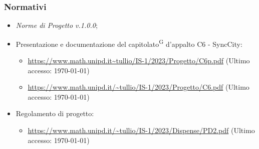 \documentclass[8pt]{article}
\newcommand{\glossterm}[1]{#1\textsuperscript{G}} %
\begin{document}
\subsubsection{Normativi}
\begin{itemize}
	\item \textit{Norme di Progetto v.1.0.0};
	\item Presentazione e documentazione del \glossterm{capitolato} d’appalto C6 - SyncCity:
	\begin{itemize}
		\item \href{https://www.math.unipd.it/~tullio/IS-1/2023/Progetto/C6p.pdf}{\color{myblue}https://www.math.unipd.it\textasciitilde{}tullio/IS-1/2023/Progetto/C6p.pdf} (Ultimo accesso: \today)
		\item \href{https://www.math.unipd.it/~tullio/IS-1/2023/Progetto/C6.pdf}{\color{myblue}https://www.math.unipd.it/\textasciitilde{}tullio/IS-1/2023/Progetto/C6.pdf} (Ultimo accesso: \today)
	\end{itemize}
	\item Regolamento di progetto:
	\begin{itemize}
		\item \href{https://www.math.unipd.it/~tullio/IS-1/2023/Dispense/PD2.pdf}{\color{myblue}https://www.math.unipd.it/\textasciitilde{}tullio/IS-1/2023/Dispense/PD2.pdf} (Ultimo accesso: \today)
	\end{itemize}
\end{itemize}
\clearpage
\end{document}
